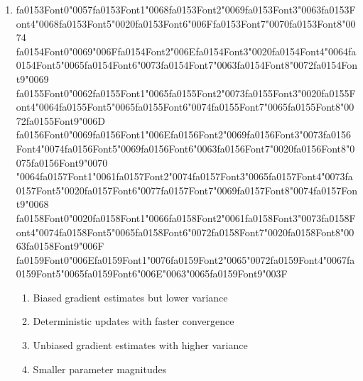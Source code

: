 \documentclass[12pt]{article}
\begin{document}
\begin{enumerate}[label=Q\arabic*.]
 \item {\csname fa0153Font0\endcsname\char"0057}{\csname fa0153Font1\endcsname\char"0068}{\csname fa0153Font2\endcsname\char"0069}{\csname fa0153Font3\endcsname\char"0063}{\csname fa0153Font4\endcsname\char"0068}{\csname fa0153Font5\endcsname\char"0020}{\csname fa0153Font6\endcsname\char"006F}{\csname fa0153Font7\endcsname\char"0070}{\csname fa0153Font8\endcsname\char"0074} {\csname fa0154Font0\endcsname\char"0069}{\char"006F}{\csname fa0154Font2\endcsname\char"006E}{\csname fa0154Font3\endcsname\char"0020}{\csname fa0154Font4\endcsname\char"0064}{\csname fa0154Font5\endcsname\char"0065}{\csname fa0154Font6\endcsname\char"0073}{\csname fa0154Font7\endcsname\char"0063}{\csname fa0154Font8\endcsname\char"0072}{\csname fa0154Font9\endcsname\char"0069} {\csname fa0155Font0\endcsname\char"0062}{\csname fa0155Font1\endcsname\char"0065}{\csname fa0155Font2\endcsname\char"0073}{\csname fa0155Font3\endcsname\char"0020}{\csname fa0155Font4\endcsname\char"0064}{\csname fa0155Font5\endcsname\char"0065}{\csname fa0155Font6\endcsname\char"0074}{\csname fa0155Font7\endcsname\char"0065}{\csname fa0155Font8\endcsname\char"0072}{\csname fa0155Font9\endcsname\char"006D} {\csname fa0156Font0\endcsname\char"0069}{\csname fa0156Font1\endcsname\char"006E}{\csname fa0156Font2\endcsname\char"0069}{\csname fa0156Font3\endcsname\char"0073}{\csname fa0156Font4\endcsname\char"0074}{\csname fa0156Font5\endcsname\char"0069}{\csname fa0156Font6\endcsname\char"0063}{\csname fa0156Font7\endcsname\char"0020}{\csname fa0156Font8\endcsname\char"0075}{\csname fa0156Font9\endcsname\char"0070} {\char"0064}{\csname fa0157Font1\endcsname\char"0061}{\csname fa0157Font2\endcsname\char"0074}{\csname fa0157Font3\endcsname\char"0065}{\csname fa0157Font4\endcsname\char"0073}{\csname fa0157Font5\endcsname\char"0020}{\csname fa0157Font6\endcsname\char"0077}{\csname fa0157Font7\endcsname\char"0069}{\csname fa0157Font8\endcsname\char"0074}{\csname fa0157Font9\endcsname\char"0068} {\csname fa0158Font0\endcsname\char"0020}{\csname fa0158Font1\endcsname\char"0066}{\csname fa0158Font2\endcsname\char"0061}{\csname fa0158Font3\endcsname\char"0073}{\csname fa0158Font4\endcsname\char"0074}{\csname fa0158Font5\endcsname\char"0065}{\csname fa0158Font6\endcsname\char"0072}{\csname fa0158Font7\endcsname\char"0020}{\csname fa0158Font8\endcsname\char"0063}{\csname fa0158Font9\endcsname\char"006F} {\csname fa0159Font0\endcsname\char"006E}{\csname fa0159Font1\endcsname\char"0076}{\csname fa0159Font2\endcsname\char"0065}{\char"0072}{\csname fa0159Font4\endcsname\char"0067}{\csname fa0159Font5\endcsname\char"0065}{\csname fa0159Font6\endcsname\char"006E}{\char"0063}{\char"0065}{\csname fa0159Font9\endcsname\char"003F}
 \begin{enumerate}[label=(\Alph*)]
     \item Biased gradient estimates but lower variance
     \item Deterministic updates with faster convergence
     \item Unbiased gradient estimates with higher variance
     \item Smaller parameter magnitudes
 \end{enumerate}
 

\end{enumerate}
\end{document}
